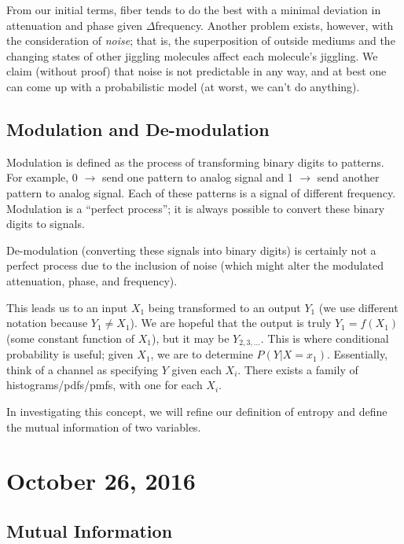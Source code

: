 \documentclass[11pt]{article}
\theoremstyle{definition}
\begin{document}
From our initial terms, fiber tends to do the best with a minimal deviation in attenuation and phase given $\Delta$frequency. Another problem exists, however, with the consideration of \textit{noise}; that is, the superposition of outside mediums and the changing states of other jiggling molecules affect each molecule's jiggling. We claim (without proof) that noise is not predictable in any way, and at best one can come up with a probabilistic model (at worst, we can't do anything). 

\subsection{Modulation and De-modulation} 

Modulation is defined as the process of transforming binary digits to patterns. For example, 0 $\rightarrow$ send one pattern to analog signal  and 1 $\rightarrow$ send another pattern to analog signal. Each of these patterns is a signal of different frequency. Modulation is a ``perfect process''; it is always possible to convert these binary digits to signals. 

De-modulation (converting these signals into binary digits) is certainly not a perfect process due to the inclusion of noise (which might alter the modulated attenuation, phase, and frequency). 

This leads us to an input $X_1$ being transformed to an output $Y_1$ (we use different notation because $Y_1 \neq X_1$). We are hopeful that the output is truly $Y_1 = f(X_1)$ (some constant function of $X_1$), but it may be $Y_{2,3,\dots}$. This is where conditional probability is useful; given $X_1$, we are to determine $P(Y|X = x_1)$. Essentially, think of a channel as specifying $Y$ given each $X_i$. There exists a family of histograms/pdfs/pmfs, with one for each $X_i$. 

In investigating this concept, we will refine our definition of entropy and define the mutual information of two variables. 

\section{October 26, 2016}

\subsection{Mutual Information}
\end{document}
